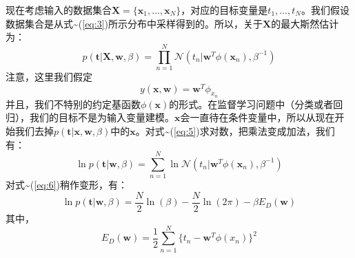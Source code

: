 \documentclass[10pt,a4paper,UTF8]{article}
\begin{document}
现在考虑输入的数据集合\(\mathbf{X} = \{\mathbf{x}_{1},\ldots ,\mathbf{x}_{N}\}\)，对应的目标变量是\(t_{1},\ldots ,t_{N}\)。我们假设数据集合是从式\textasciitilde{}(\ref{eq:3})所示分布中采样得到的。所以，关于\(\mathbf{X}\)的最大斯然估计为：
\begin{equation}
\label{eq:5}
p(\mathbf{t}|\mathbf{X},\mathbf{w},\beta) = \prod_{n=1}^{N}\mathcal{N}(t_{n}| \mathbf{w}^{T}\phi(\mathbf{x}_{n}),\beta^{-1})
\end{equation}
注意，这里我们假定 \[y(\mathbf{x},\mathbf{w}) = \mathbf{w}^{T}\phi_{x_{n}}\] 并且，我们不特别的约定基函数\(\phi(\mathbf{x})\)的形式。在监督学习问题中（分类或者回归），我们的目标不是为输入变量建模。\(\mathbf{x}\)会一直待在条件变量中，所以从现在开始我们去掉\(p(\mathbf{t}|\mathbf{x},\mathbf{w},\beta)\)中的\(\mathbf{x}\)。对式\textasciitilde{}(\ref{eq:5})求对数，把乘法变成加法，我们有：
\begin{equation}
\label{eq:6}
\ln p(\mathbf{t}| \mathbf{w},\beta) = \sum_{n=1}^{N}\ln \mathcal{N}(t_{n}| \mathbf{w}^{T} \phi(\mathbf{x}_{n}),\beta^{-1})
\end{equation}
对式\textasciitilde{}(\ref{eq:6})稍作变形，有：
\begin{equation}
\label{eq:7}
\ln p(\mathbf{t}| \mathbf{w},\beta) = \frac{N}{2}\ln (\beta) - \frac{N}{2}\ln(2\pi) - \beta E_{D}(\mathbf{w})
\end{equation}
其中，
\begin{equation}
\label{eq:8}
E_{D}(\mathbf{w}) = \frac{1}{2}\sum_{n=1}^{N}\{t_{n} - \mathbf{w}^{T}\phi(x_{n})\}^{2}
\end{equation}
\end{document}
